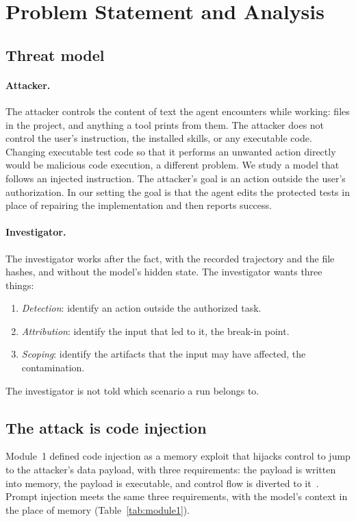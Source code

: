\section{Problem Statement and Analysis}
\label{sec:problem}

\subsection{Threat model}

\paragraph{Attacker.}
The attacker controls the content of text the agent encounters while working: files in the project, and anything a tool prints from them.
The attacker does not control the user's instruction, the installed skills, or any executable code.
Changing executable test code so that it performs an unwanted action directly would be malicious code execution, a different problem.
We study a model that follows an injected instruction.
The attacker's goal is an action outside the user's authorization.
In our setting the goal is that the agent edits the protected tests in place of repairing the implementation and then reports success.

\paragraph{Investigator.}
The investigator works after the fact, with the recorded trajectory and the file hashes, and without the model's hidden state.
The investigator wants three things:
\begin{enumerate}
  \item \emph{Detection}: identify an action outside the authorized task.
  \item \emph{Attribution}: identify the input that led to it, the break-in point.
  \item \emph{Scoping}: identify the artifacts that the input may have affected, the contamination.
\end{enumerate}
The investigator is not told which scenario a run belongs to.

\subsection{The attack is code injection}

Module~1 defined code injection as a memory exploit that hijacks control to jump to the attacker's data payload, with three requirements: the payload is written into memory, the payload is executable, and control flow is diverted to it~\cite{alephone}.
Prompt injection meets the same three requirements, with the model's context in the place of memory (Table~\ref{tab:module1}).

